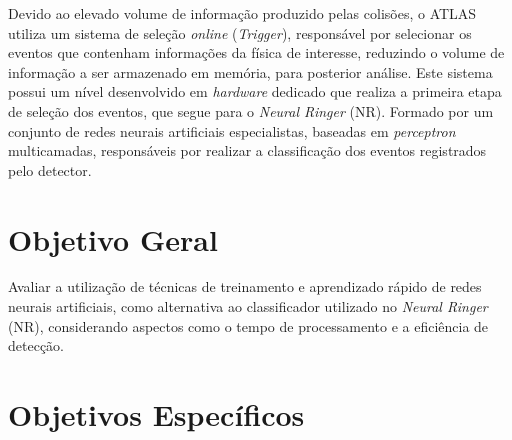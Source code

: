Devido ao elevado volume de informação produzido pelas colisões, o ATLAS utiliza um sistema de seleção \textit{online} (\textit{Trigger}), responsável por selecionar os eventos que contenham informações da física de interesse, reduzindo o volume de informação a ser armazenado em memória, para posterior análise. Este sistema possui um nível desenvolvido em \textit{hardware} dedicado que realiza a primeira etapa de seleção dos eventos, que segue para o \textit{Neural Ringer} (NR). Formado por um conjunto de redes neurais artificiais especialistas, baseadas em \textit{perceptron} multicamadas, responsáveis por realizar a classificação dos eventos registrados pelo detector.

\section{Objetivo Geral}


%

Avaliar a utilização de técnicas de treinamento e aprendizado rápido de redes neurais artificiais, como alternativa ao classificador  utilizado no \textit{Neural Ringer} (NR), considerando aspectos como o tempo de processamento e a eficiência de detecção.

\section{Objetivos Específicos}

